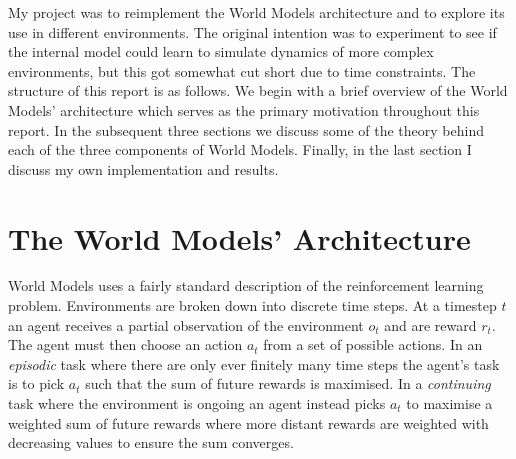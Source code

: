 \documentclass{article}
\numberwithin{figure}{section}
\theoremstyle{definition}
\begin{document}


My project was to reimplement the World Models architecture and to explore its use in different environments.
The original intention was to experiment to see if the internal model could learn to simulate dynamics of more complex environments, but this got somewhat cut short due to time constraints.
The structure of this report is as follows.
We begin with a brief overview of the World Models' architecture which serves as the primary motivation throughout this report.
In the subsequent three sections we discuss some of the theory behind each of the three components of World Models.
Finally, in the last section I discuss my own implementation and results.

\section{The World Models' Architecture}
World Models uses a fairly standard description of the reinforcement learning problem.
Environments are broken down into discrete time steps.
At a timestep $t$ an agent receives a partial observation of the environment $o_t$ and are reward $r_t$.
The agent must then choose an action $a_t$ from a set of possible actions.
In an \textit{episodic} task where there are only ever finitely many time steps the agent's task is to pick $a_t$ such that the sum of future rewards is maximised.
In a \textit{continuing} task where the environment is ongoing an agent instead picks $a_t$ to maximise a weighted sum of future rewards where more distant rewards are weighted with decreasing values to ensure the sum converges.
\end{document}
